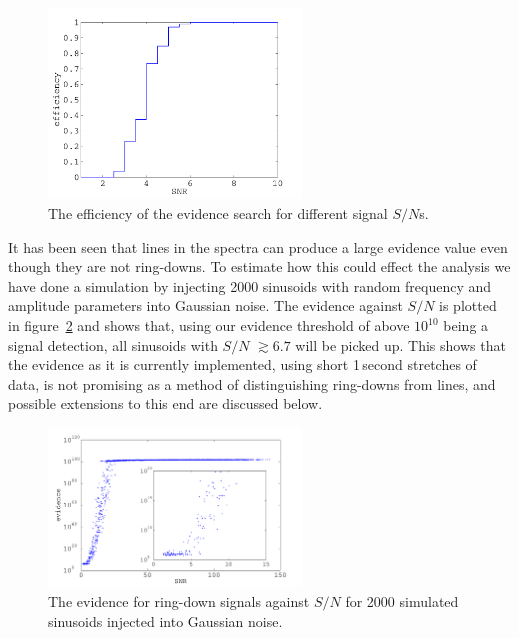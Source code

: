 \begin{figure}[!htbp]
\begin{center}
\includegraphics[width=0.6\textwidth]{figs/evidenceEfficiency}\caption{The efficiency of the
evidence search for different signal $S/N$s.}\label{evidenceEfficiency}
\end{center}
\end{figure}

It has been seen that lines in the spectra can produce a large evidence value even though they are
not ring-downs. To estimate how this could effect the analysis we have done a simulation by
injecting 2000 sinusoids with random frequency and amplitude parameters into Gaussian noise. The
evidence against $S/N$ is plotted in figure~\ref{evidenceVsSNRForSins} and shows that, using our
evidence threshold of above $10^{10}$ being a signal detection, all sinusoids with $S/N$ $\gtrsim
6.7$ will be picked up. This shows that the evidence as it is currently implemented, using short
1\,second stretches of data, is not promising as a method of distinguishing ring-downs from lines,
and possible extensions to this end are discussed below.
\begin{figure}[!htbp]
\begin{center}
\includegraphics[width=0.6\textwidth]{figs/evidenceVsSNRForSins}\caption{The evidence for ring-down
signals against $S/N$ for 2000 simulated sinusoids injected into Gaussian
noise.}\label{evidenceVsSNRForSins}
\end{center}
\end{figure}


